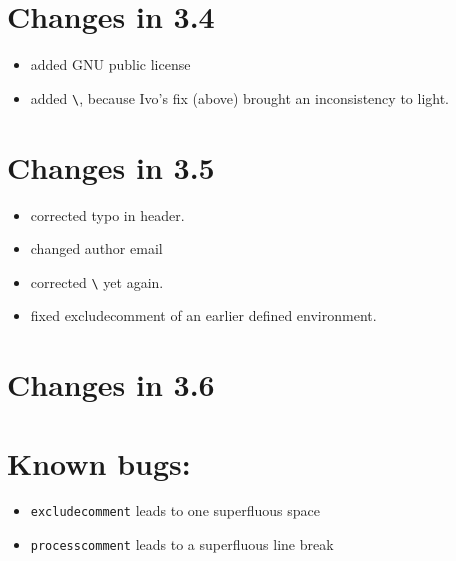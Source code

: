 \documentclass[parskip=false, DIV=8, headings=normal, pagesize=auto]{scrartcl}
\makeatletter
\newcommand*{\cs}[1]{\texttt{\textbackslash#1}}
\newcommand*{\cmd}[1]{\cs{\expandafter\@gobble\string#1}}
\makeatother
\begin{document}
\section{Changes in 3.4}

\begin{itemize}
\item added GNU public license
\item added \cmd{\processcomment}, because Ivo's fix (above) brought an
  inconsistency to light.
\end{itemize}

  
\section{Changes in 3.5}

\begin{itemize}
\item corrected typo in header.
\item changed author email
\item corrected \cmd{\specialcomment} yet again.
\item fixed excludecomment of an earlier defined environment.
\end{itemize}


\section{Changes in 3.6}



\section{Known bugs:}

\begin{itemize}
\item \texttt{excludecomment} leads to one superfluous space
\item \texttt{processcomment} leads to a superfluous line break
\end{itemize}
\end{document}
